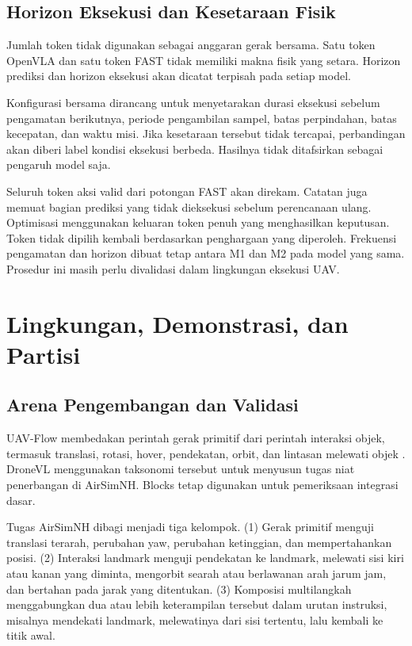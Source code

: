 \subsection{Horizon Eksekusi dan Kesetaraan Fisik}
Jumlah token tidak digunakan sebagai anggaran gerak bersama. Satu token OpenVLA dan satu token FAST tidak memiliki makna fisik yang setara. Horizon prediksi dan horizon eksekusi akan dicatat terpisah pada setiap model.

Konfigurasi bersama dirancang untuk menyetarakan durasi eksekusi sebelum pengamatan berikutnya, periode pengambilan sampel, batas perpindahan, batas kecepatan, dan waktu misi. Jika kesetaraan tersebut tidak tercapai, perbandingan akan diberi label kondisi eksekusi berbeda. Hasilnya tidak ditafsirkan sebagai pengaruh model saja.

Seluruh token aksi valid dari potongan FAST akan direkam. Catatan juga memuat bagian prediksi yang tidak dieksekusi sebelum perencanaan ulang. Optimisasi menggunakan keluaran token penuh yang menghasilkan keputusan. Token tidak dipilih kembali berdasarkan penghargaan yang diperoleh. Frekuensi pengamatan dan horizon dibuat tetap antara M1 dan M2 pada model yang sama. Prosedur ini masih perlu divalidasi dalam lingkungan eksekusi UAV.

\section{Lingkungan, Demonstrasi, dan Partisi}
\label{sec:rancangan_arena}
\subsection{Arena Pengembangan dan Validasi}
UAV-Flow membedakan perintah gerak primitif dari perintah interaksi objek, termasuk translasi, rotasi, hover, pendekatan, orbit, dan lintasan melewati objek \citep{wang2025uavflow}. DroneVL menggunakan taksonomi tersebut untuk menyusun tugas niat penerbangan di AirSimNH. Blocks tetap digunakan untuk pemeriksaan integrasi dasar.

Tugas AirSimNH dibagi menjadi tiga kelompok. (1) Gerak primitif menguji translasi terarah, perubahan yaw, perubahan ketinggian, dan mempertahankan posisi. (2) Interaksi landmark menguji pendekatan ke landmark, melewati sisi kiri atau kanan yang diminta, mengorbit searah atau berlawanan arah jarum jam, dan bertahan pada jarak yang ditentukan. (3) Komposisi multilangkah menggabungkan dua atau lebih keterampilan tersebut dalam urutan instruksi, misalnya mendekati landmark, melewatinya dari sisi tertentu, lalu kembali ke titik awal.

